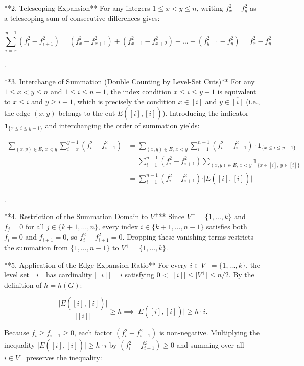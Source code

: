 \documentclass{article}
\begin{document}
**2. Telescoping Expansion**
For any integers $1 \le x < y \le n$, writing $f_x^2 - f_y^2$ as a telescoping sum of consecutive differences gives:


$$\sum_{i=x}^{y-1} (f_i^2 - f_{i+1}^2) = (f_x^2 - f_{x+1}^2) + (f_{x+1}^2 - f_{x+2}^2) + \dots + (f_{y-1}^2 - f_y^2) = f_x^2 - f_y^2$$

.

**3. Interchange of Summation (Double Counting by Level-Set Cuts)**
For any $1 \le x < y \le n$ and $1 \le i \le n-1$, the index condition $x \le i \le y - 1$ is equivalent to $x \le i$ and $y \ge i + 1$, which is precisely the condition $x \in [i]$ and $y \in \overline{[i]}$ (i.e., the edge $(x, y)$ belongs to the cut $E([i], \overline{[i]})$). Introducing the indicator $\mathbf{1}_{\{x \le i \le y-1\}}$ and interchanging the order of summation yields:


$$\begin{aligned} \sum_{(x,y) \in E,\, x < y} \sum_{i=x}^{y-1} (f_i^2 - f_{i+1}^2) &= \sum_{(x,y) \in E,\, x < y} \sum_{i=1}^{n-1} (f_i^2 - f_{i+1}^2) \cdot \mathbf{1}_{\{x \le i \le y-1\}} \\ &= \sum_{i=1}^{n-1} (f_i^2 - f_{i+1}^2) \sum_{(x,y) \in E,\, x < y} \mathbf{1}_{\{x \in [i],\, y \in \overline{[i]}\}} \\ &= \sum_{i=1}^{n-1} (f_i^2 - f_{i+1}^2) \cdot \vert{}E([i], \overline{[i]})\vert{} \end{aligned}$$

.

**4. Restriction of the Summation Domain to $V^+$**
Since $V^+ = \{1, \dots, k\}$ and $f_j = 0$ for all $j \in \{k+1, \dots, n\}$, every index $i \in \{k+1, \dots, n-1\}$ satisfies both $f_i = 0$ and $f_{i+1} = 0$, so $f_i^2 - f_{i+1}^2 = 0$. Dropping these vanishing terms restricts the summation from $\{1, \dots, n-1\}$ to $V^+ = \{1, \dots, k\}$.

**5. Application of the Edge Expansion Ratio**
For every $i \in V^+ = \{1, \dots, k\}$, the level set $[i]$ has cardinality $\vert{}[i]\vert{} = i$ satisfying $0 < \vert{}[i]\vert{} \le \vert{}V^+\vert{} \le n/2$. By the definition of $h = h(G)$:


$$\frac{\vert{}E([i], \overline{[i]})\vert{}}{\vert{}[i]\vert{}} \ge h \implies \vert{}E([i], \overline{[i]})\vert{} \ge h \cdot i.$$


Because $f_i \ge f_{i+1} \ge 0$, each factor $(f_i^2 - f_{i+1}^2)$ is non-negative. Multiplying the inequality $\vert{}E([i], \overline{[i]})\vert{} \ge h \cdot i$ by $(f_i^2 - f_{i+1}^2) \ge 0$ and summing over all $i \in V^+$ preserves the inequality:
\end{document}

